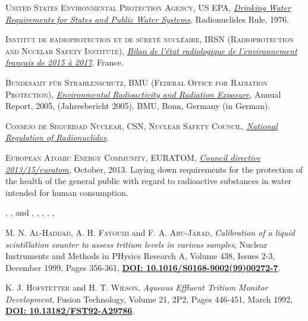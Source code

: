\begin{thebibliography}{100}
 \textsc{United States Environmental Protection Agency, US EPA},
\href{https://www.epa.gov/dwreginfo/radionuclides-rule}{\textit{Drinking Water Requirements for States and Public Water Systems}}, Radionuclides Rule, 1976. 

 \textsc{Institut de radioprotection et de sûreté nucléaire, IRSN (Radioprotection and Nucelar Safety Institute)},
\href{https://www.google.com/url?sa=t&rct=j&q=&esrc=s&source=web&cd=&ved=2ahUKEwiskum8mYLwAhXLB2MBHWLgAkoQFjAAegQIBBAD&url=https\%3A\%2F\%2Fwww.actu-environnement.com\%2Fmedia\%2Fpdf\%2Fnews-32705-bilan.pdf&usg=AOvVaw0oCSJP78IgV1Tek0T4_6z1}{\textit{Bilan de l’état radiologique  de l’environnement français  de 2015 à 2017}}. France. 

 \textsc{Bundesamt für Strahlenschutz, BMU (Federal Office for Radiation Protection)},
\href{http://doris.bfs.de/jspui/handle/urn:nbn:de:0221-20100331990}{\textit{ Environmental Radioactivity and Radiation Exposure}}, Annual Report, 2005, (Jahresbericht 2005). BMU, Bonn, Germany (in German). 

 \textsc{Consejo de Seguridad Nuclear, CSN, Nuclear Safety Council},
\href{https://www.csn.es/en/normativa-del-csn/normativa-espanola}{\textit{National Regulation of Radionuclides}}. 

 \textsc{European Atomic Energy Community, EURATOM},
\href{https://eur-lex.europa.eu/eli/dir/2013/59/oj}{\textit{Council directive 2013/15/euratom}}, October, 2013. Laying down requirements for the protection of the health of the general public with regard to radioactive substances in water intended for human consumption. 

 \textsc{}, \textsc{}, \textsc{} and \textsc{},
\textit{}, , , , \textbf{}

 \textsc{M. N. Al-Haddad}, \textsc{A. H. Fayoumi} and \textsc{F. A. Abu-Jarad},
\textit{Calibration of a liquid scintillation counter to assess tritium levels in various samples}, Nuclear Instruments and Methods in PHysics Research A, Volume 438, Issues 2-3, December 1999, Pages 356-361, \href{https://doi.org/10.1016/S0168-9002(99)00272-7}{\textbf{DOI: 10.1016/S0168-9002(99)00272-7}}.

 \textsc{K. J. Hofstetter} and \textsc{H. T. Wilson},
\textit{Aqueous Effluent Tritium Monitor Development}, Fusion Technology, Volume 21, 2P2, Pages 446-451, March 1992, \href{https://doi.org/10.13182/FST92-A29786}{\textbf{DOI: 10.13182/FST92-A29786}}.


\end{thebibliography}
